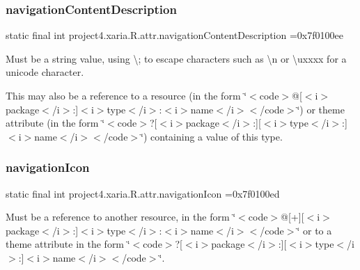 \subsubsection{\texorpdfstring{navigation\+Content\+Description}{navigationContentDescription}}
{\footnotesize\ttfamily static final int project4.\+xaria.\+R.\+attr.\+navigation\+Content\+Description =0x7f0100ee\hspace{0.3cm}{\ttfamily [static]}}

Must be a string value, using \textquotesingle{}\textbackslash{};\textquotesingle{} to escape characters such as \textquotesingle{}\textbackslash{}n\textquotesingle{} or \textquotesingle{}\textbackslash{}uxxxx\textquotesingle{} for a unicode character. 

This may also be a reference to a resource (in the form \char`\"{}$<$code$>$@\mbox{[}$<$i$>$package$<$/i$>$\+:\mbox{]}$<$i$>$type$<$/i$>$\+:$<$i$>$name$<$/i$>$$<$/code$>$\char`\"{}) or theme attribute (in the form \char`\"{}$<$code$>$?\mbox{[}$<$i$>$package$<$/i$>$\+:\mbox{]}\mbox{[}$<$i$>$type$<$/i$>$\+:\mbox{]}$<$i$>$name$<$/i$>$$<$/code$>$\char`\"{}) containing a value of this type. \mbox{\label{classproject4_1_1xaria_1_1R_1_1attr_ab61b7ef4b6315b57f65be0d1e8c6a537}} 
\subsubsection{\texorpdfstring{navigation\+Icon}{navigationIcon}}
{\footnotesize\ttfamily static final int project4.\+xaria.\+R.\+attr.\+navigation\+Icon =0x7f0100ed\hspace{0.3cm}{\ttfamily [static]}}

Must be a reference to another resource, in the form \char`\"{}$<$code$>$@\mbox{[}+\mbox{]}\mbox{[}$<$i$>$package$<$/i$>$\+:\mbox{]}$<$i$>$type$<$/i$>$\+:$<$i$>$name$<$/i$>$$<$/code$>$\char`\"{} or to a theme attribute in the form \char`\"{}$<$code$>$?\mbox{[}$<$i$>$package$<$/i$>$\+:\mbox{]}\mbox{[}$<$i$>$type$<$/i$>$\+:\mbox{]}$<$i$>$name$<$/i$>$$<$/code$>$\char`\"{}. \mbox{\label{classproject4_1_1xaria_1_1R_1_1attr_a36e447722ef621ee6c9128adca581af0}} 
